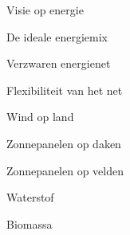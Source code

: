 
\begin{voorstel}{Visie op energie}\end{voorstel}

\begin{voorstel}{De ideale energiemix}\end{voorstel}
\begin{voorstel}{Verzwaren energienet}\end{voorstel}
\begin{voorstel}{Flexibiliteit van het net}\end{voorstel}

\begin{voorstel}{Wind op land}\end{voorstel}
\begin{voorstel}{Zonnepanelen op daken}\end{voorstel}
\begin{voorstel}{Zonnepanelen op velden}\end{voorstel}
\begin{voorstel}{Waterstof}\end{voorstel}
\begin{voorstel}{Biomassa}\end{voorstel}
